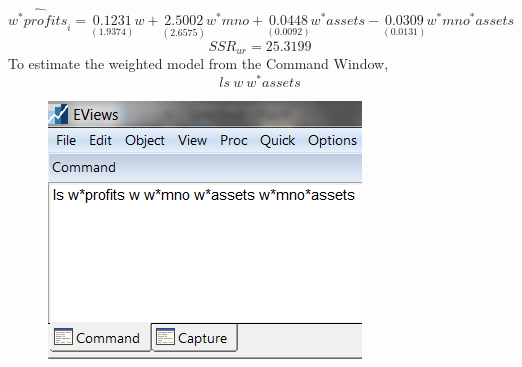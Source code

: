 \documentclass[12pt]{report}
\begin{document}
$$\widehat{w^*profits}_i = \underset{(1.9374)}{0.1231}w + \underset{(2.6575)}{2.5002}w^*mno + \underset{(0.0092)}{0.0448}w^*assets - \underset{(0.0131)}{0.0309}w^*mno^*assets$$ $$SSR_{ur} = 25.3199$$
\noindent To estimate the weighted model from the Command Window,
$$ls\ w\ w^*assets$$
\begin{figure}[H]
	\centering
	\includegraphics{tute9_11}
\end{figure}
\vspace{-\baselineskip} 
\end{document}
